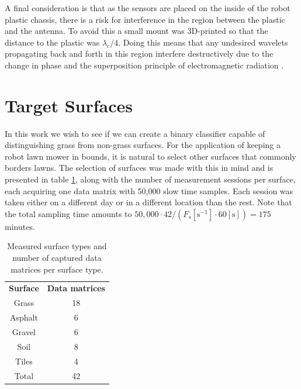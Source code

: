 A final consideration is that as the sensors are placed on the inside of the robot plastic chassis, there is a risk for interference in the region between the plastic and the antenna. To avoid this a small mount was 3D-printed so that the distance to the plastic was $\lambda_c/4$. Doing this means that any undesired wavelets propagating back and forth in this region interfere destructively due to the change in phase and the superposition principle of electromagnetic radiation \citep{griffiths_2018}.

\section{Target Surfaces}

In this work we wish to see if we can create a binary classifier capable of distinguishing grass from non-grass surfaces. For the application of keeping a robot lawn mower in bounds, it is natural to select other surfaces that commonly borders lawns. The selection of surfaces was made with this in mind and is presented in table \ref{tab:count}, along with the number of measurement sessions per surface, each acquiring one data matrix with 50,000 slow time samples. Each session was taken either on a different day or in a different location than the rest. Note that the total sampling time amounts to $50,000\cdot42/(F_s [\text{s}^{-1}]\cdot60[\text{s}])=175$ minutes.

\begin{table}
	\begin{center}
		\begin{tabular}{|c|c|}
			\hline
			\rowcolor{gray!150}\color{white}\textbf{Surface} & \color{white}\textbf{Data matrices} \\
			Grass & 18 \\
			\rowcolor{gray!25} Asphalt & 6 \\
			Gravel & 6 \\
			\rowcolor{gray!25} Soil & 8 \\
			Tiles & 4 \\ \hline
			\rowcolor{gray!25} Total & 42 \\
			\hline
		\end{tabular}
	\end{center}
	\caption{Measured surface types and number of captured data matrices per surface type.}
	\label{tab:count}
\end{table}

